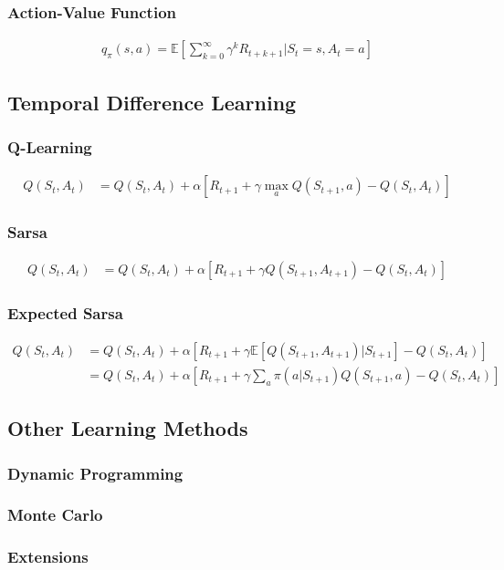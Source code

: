 \documentclass[result.tex]{subfiles}
\begin{document}
    \subsubsection*{Action-Value Function}

    \begin{align*}
        q_{\pi}(s, a) = \mathbb{E} \left[ \sum_{k=0}^{\infty} \gamma^k R_{t + k + 1} \bigg\rvert S_t = s, A_t = a \right]
    \end{align*}

    \subsection*{Temporal Difference Learning}

    \subsubsection*{Q-Learning}

    \begin{align*}
        Q(S_t, A_t) &=
        Q(S_t , A_t) +
        \alpha \left[
        R_{t + 1} +
        \gamma \max_a Q(S_{t + 1}, a) - Q(S_t, A_t)
        \right]
    \end{align*}

    \subsubsection*{Sarsa}

    \begin{align*}
        Q(S_t, A_t) &=
        Q(S_t , A_t) +
        \alpha \left[
        R_{t + 1} +
        \gamma Q(S_{t + 1}, A_{t + 1}) - Q(S_t, A_t)
        \right]
    \end{align*}

    \subsubsection*{Expected Sarsa}

    \begin{align*}
        Q(S_t, A_t) &=
        Q(S_t , A_t) +
        \alpha \left[
        R_{t + 1} +
        \gamma \mathbb{E} \left[ Q(S_{t + 1}, A_{t + 1}) | S_{t + 1}
        \right] -
        Q(S_t, A_t)
        \right] \\
        &=
        Q(S_t , A_t) +
        \alpha \left[
        R_{t + 1} +
        \gamma \sum_a \pi (a | S_{t + 1}) Q(S_{t + 1}, a) -
        Q(S_t, A_t)
        \right]
    \end{align*}

    \subsection*{Other Learning Methods}

    \subsubsection*{Dynamic Programming}

    \subsubsection*{Monte Carlo}

    \subsubsection*{Extensions}
\end{document}
